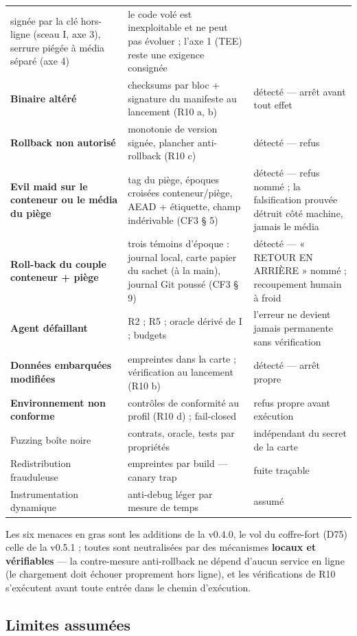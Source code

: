 \begin{table}[htbp]
\begin{tabularx}{\textwidth}{@{}Y Y Y@{}}
signée par la clé hors-ligne (sceau I, axe 3), serrure piégée à média séparé (axe 4) &
le code volé est inexploitable et ne peut pas évoluer ; l'axe 1 (TEE) reste une
exigence consignée \\
\textbf{Binaire altéré} & checksums par bloc + signature du manifeste au lancement
(R10 a, b) & détecté — arrêt avant tout effet \\
\textbf{Rollback non autorisé} & monotonie de version signée, plancher anti-rollback
(R10 c) & détecté — refus \\
\textbf{Evil maid sur le conteneur ou le média du piège} & tag du piège, époques
croisées conteneur/piège, AEAD + étiquette, champ  indérivable (CF3
§ 5) & détecté — refus nommé ; la falsification prouvée détruit côté machine,
jamais le média \\
\textbf{Roll-back du couple conteneur + piège} & trois témoins d'époque : journal
local, carte papier du sachet (à la main), journal Git poussé (CF3 § 9) & détecté —
« RETOUR EN ARRIÈRE » nommé ; recoupement humain à froid \\
\textbf{Agent défaillant} & R2 ; R5 ; oracle dérivé de I ; budgets & l'erreur ne devient
jamais permanente sans vérification \\
\textbf{Données embarquées modifiées} & empreintes dans la carte ; vérification au
lancement (R10 b) & détecté — arrêt propre \\
\textbf{Environnement non conforme} & contrôles de conformité au profil (R10 d) ;
fail-closed & refus propre avant exécution \\
Fuzzing boîte noire & contrats, oracle, tests par propriétés & indépendant du secret de
la carte \\
Redistribution frauduleuse & empreintes par build — canary trap & fuite traçable \\
Instrumentation dynamique & anti-debug léger par mesure de temps & assumé \\
\bottomrule
\end{tabularx}
\end{table}

Les six menaces en gras sont les additions de la v0.4.0, le vol du coffre-fort (D75)
celle de la v0.5.1 ; toutes sont neutralisées par des mécanismes \textbf{locaux et
vérifiables} — la contre-mesure anti-rollback ne dépend d'aucun service en ligne (le
chargement doit échouer proprement hors ligne), et les vérifications de R10 s'exécutent
avant toute entrée dans le chemin d'exécution.

\subsection{Limites assumées}\label{sec:limites}

